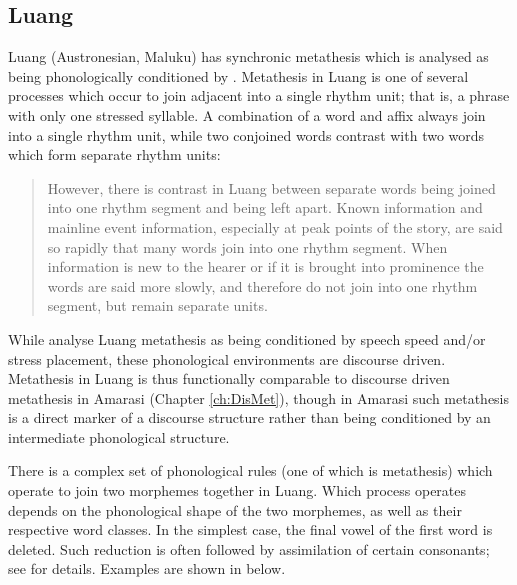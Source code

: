 \subsection{Luang}\label{sec:Lua}
Luang (Austronesian, Maluku) has synchronic metathesis
which is analysed as being phonologically conditioned by \citet{tata15}.
Metathesis in Luang is one of several processes which occur to
join adjacent into a single rhythm unit;
that is, a phrase with only one stressed syllable.
A combination of a word and affix always join into a single rhythm unit,
while two conjoined words contrast with two words which form separate rhythm units:

\begin{quote}
However, there is contrast in Luang between separate
words being joined into one rhythm segment and being left apart.
Known information and mainline event information,
especially at peak points of the story,
are said so rapidly that many words join into one rhythm segment.
When information is new to the hearer or if it is brought into prominence the words are said more
slowly, and therefore do not join into one rhythm segment, but remain separate units. \hfill\citep[24]{tata15}
\end{quote}

While \cite{tata15} analyse Luang metathesis as being conditioned by speech speed and/or stress placement,
these phonological environments are discourse driven.
Metathesis in Luang is thus functionally comparable to
discourse driven metathesis in Amarasi (Chapter \ref{ch:DisMet}),
though in Amarasi such metathesis is a direct marker of a discourse structure
rather than being conditioned by an intermediate phonological structure.

There is a complex set of phonological rules (one of which is metathesis)
which operate to join two morphemes together in Luang.
Which process operates depends on the phonological shape of the two morphemes,
as well as their respective word classes.
In the simplest case, the final vowel of the first word is deleted.
Such reduction is often followed by assimilation of certain consonants;
see \citet[25]{tata15} for details.
Examples are shown in  below.

\begin{exe}
	\label{ex:LuaVowDel}
\end{exe}

